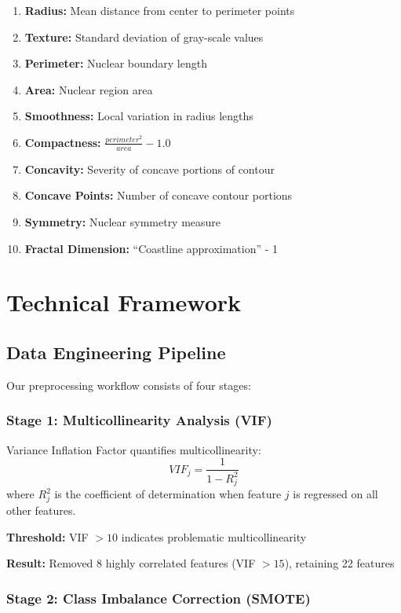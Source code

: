 \documentclass[11pt,a4paper]{article}
\begin{document}
\begin{enumerate}
    \item \textbf{Radius:} Mean distance from center to perimeter points
    \item \textbf{Texture:} Standard deviation of gray-scale values
    \item \textbf{Perimeter:} Nuclear boundary length
    \item \textbf{Area:} Nuclear region area
    \item \textbf{Smoothness:} Local variation in radius lengths
    \item \textbf{Compactness:} $\frac{perimeter^2}{area} - 1.0$
    \item \textbf{Concavity:} Severity of concave portions of contour
    \item \textbf{Concave Points:} Number of concave contour portions
    \item \textbf{Symmetry:} Nuclear symmetry measure
    \item \textbf{Fractal Dimension:} ``Coastline approximation'' - 1
\end{enumerate}

\section{Technical Framework}

\subsection{Data Engineering Pipeline}

Our preprocessing workflow consists of four stages:

\subsubsection{Stage 1: Multicollinearity Analysis (VIF)}

Variance Inflation Factor quantifies multicollinearity:
\begin{equation}
VIF_j = \frac{1}{1 - R_j^2}
\end{equation}
where $R_j^2$ is the coefficient of determination when feature $j$ is regressed on all other features.

\textbf{Threshold:} VIF $> 10$ indicates problematic multicollinearity

\textbf{Result:} Removed 8 highly correlated features (VIF $> 15$), retaining 22 features

\subsubsection{Stage 2: Class Imbalance Correction (SMOTE)}
\end{document}
